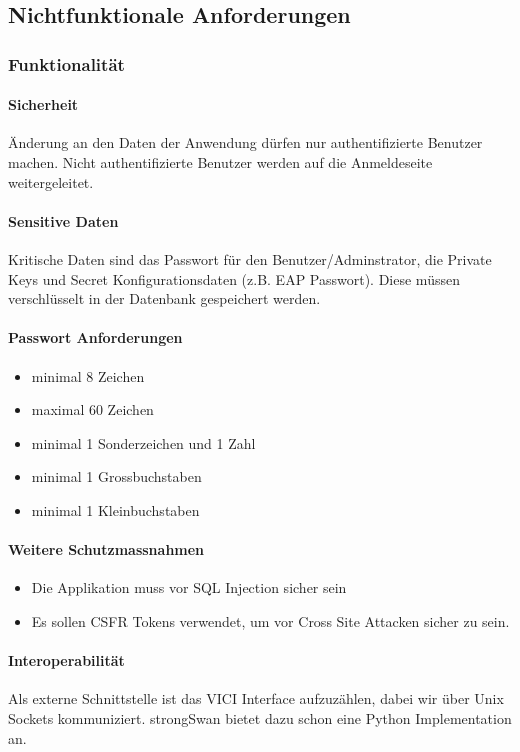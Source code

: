 \subsection{Nichtfunktionale Anforderungen}
\subsubsection{Funktionalität}
\paragraph{Sicherheit}
Änderung an den Daten der Anwendung dürfen nur authentifizierte Benutzer machen. Nicht authentifizierte Benutzer werden auf die Anmeldeseite weitergeleitet.

\paragraph{Sensitive Daten}
Kritische Daten sind das Passwort für den Benutzer/Adminstrator, die Private Keys und Secret Konfigurationsdaten (z.B. EAP Passwort). Diese müssen verschlüsselt in der Datenbank gespeichert werden.

\paragraph{Passwort Anforderungen}
\begin{itemize}
	\item minimal 8 Zeichen
	\item maximal 60 Zeichen
	\item minimal 1 Sonderzeichen und 1 Zahl
	\item minimal 1 Grossbuchstaben
	\item minimal 1 Kleinbuchstaben
\end{itemize}

\paragraph{Weitere Schutzmassnahmen}
\begin{itemize}
	\item Die Applikation muss vor SQL Injection sicher sein
	\item Es sollen CSFR Tokens verwendet, um vor Cross Site Attacken sicher zu sein.
\end{itemize}

\paragraph{Interoperabilität}
Als externe Schnittstelle ist das VICI Interface aufzuzählen, dabei wir über Unix Sockets kommuniziert. strongSwan bietet dazu schon eine Python Implementation an.
